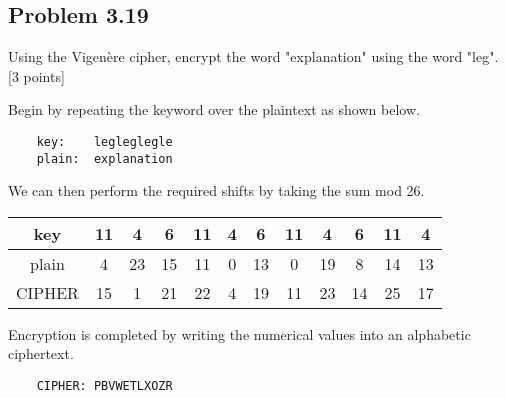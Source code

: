 \documentclass[../hw_sols.tex]{subfiles}
\begin{document}
\vspace{0.5cm}



\subsection*{Problem 3.19}
Using the Vigenère cipher, encrypt the word "explanation" using the word "leg". [3 points]


\begin{solution}
Begin by repeating the keyword over the plaintext as shown below.

\begin{verbatim}
    key:    legleglegle
    plain:  explanation
\end{verbatim}

\noindent We can then perform the required shifts by taking the sum mod 26.
\begin{center}
	\begin{tabular}{ *{12}{| c } | }
		\hline
		   key & 11 &  4 &  6 & 11 & 4 &  6 & 11 &  4 &  6 & 11 &  4 \\
		\hline
		 plain &  4 & 23 & 15 & 11 & 0 & 13 &  0 & 19 &  8 & 14 & 13 \\
		\hline
		CIPHER & 15 &  1 & 21 & 22 & 4 & 19 & 11 & 23 & 14 & 25 & 17 \\
		\hline
	\end{tabular}
\end{center}

\noindent Encryption is completed by writing the numerical values into an alphabetic ciphertext.

	\begin{verbatim}
    CIPHER: PBVWETLXOZR
	\end{verbatim}

\end{solution}


\newpage


\end{document}
